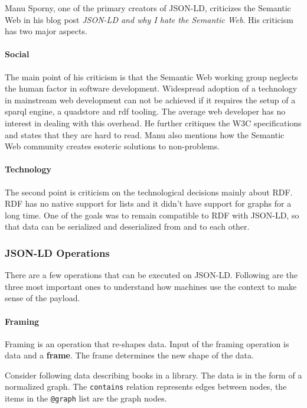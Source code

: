 Manu Sporny, one of the primary creators of JSON-LD, criticizes the Semantic Web in his blog post \textit{JSON-LD and why I hate the Semantic Web}. His criticism has two major aspects.

\paragraph{Social}
The main point of his criticism is that the Semantic Web working group neglects the human factor in software development. Widespread adoption of a technology in mainstream web development can not be achieved if it requires the setup of a \gls{sparql} engine, a \gls{quadstore} and \gls{rdf} tooling. The average web developer has no interest in dealing with this overhead. He further critiques the W3C specifications and states that they are hard to read. \citep{semanticwebrevisited} Manu also mentions how the Semantic Web community creates esoteric solutions to non-problems. \citep{semanticwebrevisited}

\paragraph{Technology}
The second point is criticism on the technological decisions mainly about RDF. RDF has no native support for lists and it didn't have support for graphs for a long time. One of the goals was to remain compatible to RDF with JSON-LD, so that data can be serialized and deserialized from and to each other. \citep{semanticwebrevisited}

\subsubsection{JSON-LD Operations}
There are a few operations that can be executed on JSON-LD. Following are the three most important ones to understand how machines use the context to make sense of the payload.

\paragraph{Framing}
Framing is an operation that re-shapes data. Input of the framing operation is data and a \textbf{frame}. The frame determines the new shape of the data.

Consider following data describing books in a library. The data is in the form of a normalized graph. The \lstinline{contains} relation represents edges between nodes, the items in the \lstinline{@graph} list are the graph nodes.

